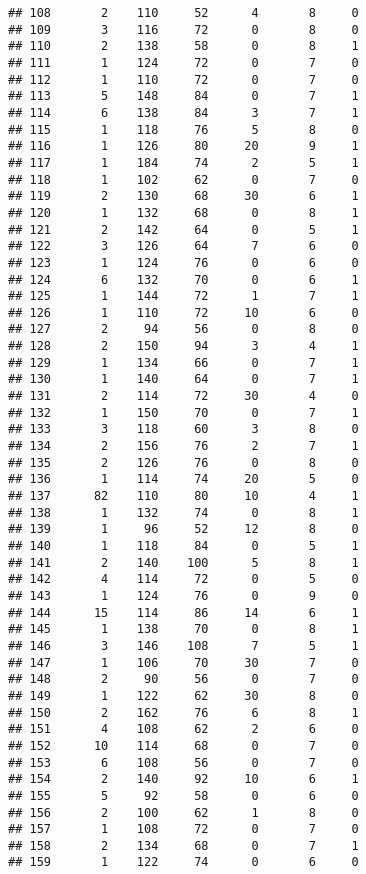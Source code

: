 \documentclass[
]{article}
\begin{document}
\begin{verbatim}
## 108       2    110     52      4       8     0
## 109       3    116     72      0       8     0
## 110       2    138     58      0       8     1
## 111       1    124     72      0       7     0
## 112       1    110     72      0       7     0
## 113       5    148     84      0       7     1
## 114       6    138     84      3       7     1
## 115       1    118     76      5       8     0
## 116       1    126     80     20       9     1
## 117       1    184     74      2       5     1
## 118       1    102     62      0       7     0
## 119       2    130     68     30       6     1
## 120       1    132     68      0       8     1
## 121       2    142     64      0       5     1
## 122       3    126     64      7       6     0
## 123       1    124     76      0       6     0
## 124       6    132     70      0       6     1
## 125       1    144     72      1       7     1
## 126       1    110     72     10       6     0
## 127       2     94     56      0       8     0
## 128       2    150     94      3       4     1
## 129       1    134     66      0       7     1
## 130       1    140     64      0       7     1
## 131       2    114     72     30       4     0
## 132       1    150     70      0       7     1
## 133       3    118     60      3       8     0
## 134       2    156     76      2       7     1
## 135       2    126     76      0       8     0
## 136       1    114     74     20       5     0
## 137      82    110     80     10       4     1
## 138       1    132     74      0       8     1
## 139       1     96     52     12       8     0
## 140       1    118     84      0       5     1
## 141       2    140    100      5       8     1
## 142       4    114     72      0       5     0
## 143       1    124     76      0       9     0
## 144      15    114     86     14       6     1
## 145       1    138     70      0       8     1
## 146       3    146    108      7       5     1
## 147       1    106     70     30       7     0
## 148       2     90     56      0       7     0
## 149       1    122     62     30       8     0
## 150       2    162     76      6       8     1
## 151       4    108     62      2       6     0
## 152      10    114     68      0       7     0
## 153       6    108     56      0       7     0
## 154       2    140     92     10       6     1
## 155       5     92     58      0       6     0
## 156       2    100     62      1       8     0
## 157       1    108     72      0       7     0
## 158       2    134     68      0       7     1
## 159       1    122     74      0       6     0

\end{verbatim}
\end{document}
